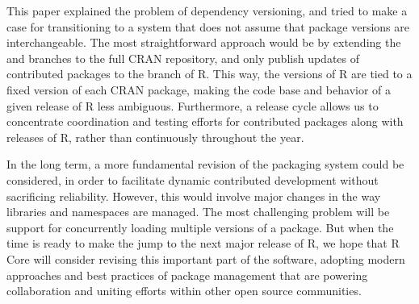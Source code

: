 This paper explained the problem of dependency versioning, and tried to make
a case for transitioning to a system that does not assume that package versions
are interchangeable. The most straightforward approach would be by extending
the  and  branches to the full CRAN repository, and
only publish updates of contributed packages to the 
branch of R. This way, the  versions of R are tied to a fixed
version of each CRAN package, making the code base and behavior of a
given release of R less ambiguous. Furthermore, a release cycle allows us
to concentrate coordination and testing efforts for contributed packages along
with releases of R, rather than continuously throughout the year.

In the long term, a more fundamental revision of the packaging system could be
considered, in order to facilitate dynamic contributed development without
sacrificing reliability. However, this would involve major changes in the way
libraries and namespaces are managed. The most challenging problem will be
support for concurrently loading multiple versions of a package. 
But when the time is ready to make the jump to the next major release of R, we
hope that R Core will consider revising this important part of the software,
adopting modern approaches and best practices of package management that are
powering collaboration and uniting efforts within other open source communities.




